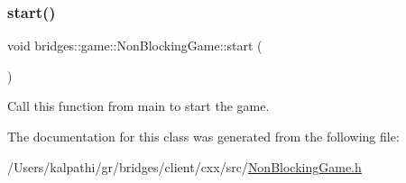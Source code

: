 \subsubsection{\texorpdfstring{start()}{start()}}
{\footnotesize\ttfamily void bridges\+::game\+::\+Non\+Blocking\+Game\+::start (\begin{DoxyParamCaption}{ }\end{DoxyParamCaption})\hspace{0.3cm}{\ttfamily [inline]}}



Call this function from main to start the game. 



The documentation for this class was generated from the following file\+:\begin{DoxyCompactItemize}
\item 
/\+Users/kalpathi/gr/bridges/client/cxx/src/\mbox{\hyperlink{_non_blocking_game_8h}{Non\+Blocking\+Game.\+h}}\end{DoxyCompactItemize}
